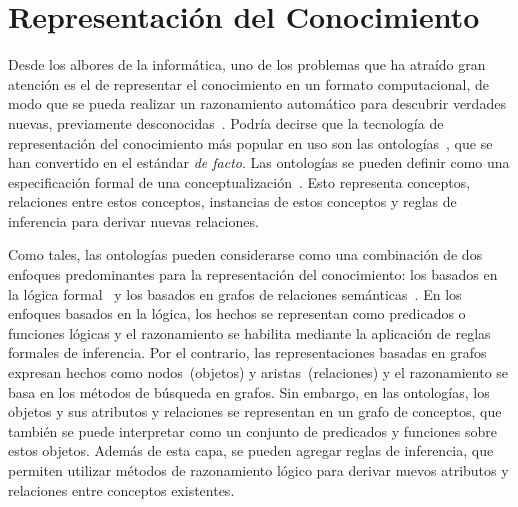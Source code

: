 \section{Representación del Conocimiento}\label{sec:sota-ontology}

Desde los albores de la informática, uno de los problemas que ha atraído gran atención es el de representar el conocimiento en un formato computacional, de modo que se pueda realizar un razonamiento automático para descubrir verdades nuevas, previamente desconocidas~\cite{sowa2000knowledge}.
Podría decirse que la tecnología de representación del conocimiento más popular en uso son las ontologías~\cite{guarino1995formal}, que se han convertido en el estándar \emph{de facto}.
Las ontologías se pueden definir como una especificación formal de una conceptualización~\cite{asuncion2003}. Esto representa conceptos, relaciones entre estos conceptos, instancias de estos conceptos y reglas de inferencia para derivar nuevas relaciones.

Como tales, las ontologías pueden considerarse como una combinación de dos enfoques predominantes para la representación del conocimiento: los basados en la lógica formal~\cite{brachman1992knowledge} y los basados en grafos de relaciones semánticas~\cite{chein2008graph}.
En los enfoques basados en la lógica, los hechos se representan como predicados o funciones lógicas y el razonamiento se habilita mediante la aplicación de reglas formales de inferencia.
Por el contrario, las representaciones basadas en grafos expresan hechos como nodos~(objetos) y aristas~(relaciones) y el razonamiento se basa en los métodos de búsqueda en grafos.
Sin embargo, en las ontologías, los objetos y sus atributos y relaciones se representan en un grafo de conceptos, que también se puede interpretar como un conjunto de predicados y funciones sobre estos objetos. Además de esta capa, se pueden agregar reglas de inferencia, que permiten utilizar métodos de razonamiento lógico para derivar nuevos atributos y relaciones entre conceptos existentes.

